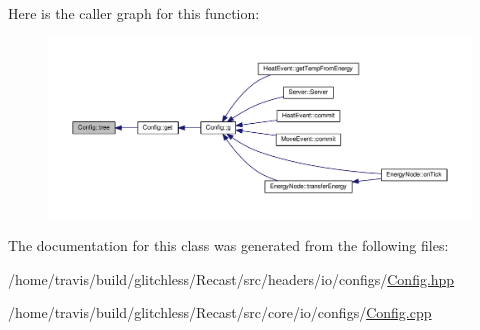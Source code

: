 Here is the caller graph for this function\-:
\nopagebreak
\begin{figure}[H]
\begin{center}
\leavevmode
\includegraphics[width=350pt]{class_config_a006701bd126aa5809b3a15e75c63bfb6_icgraph}
\end{center}
\end{figure}




The documentation for this class was generated from the following files\-:\begin{DoxyCompactItemize}
\item 
/home/travis/build/glitchless/\-Recast/src/headers/io/configs/\hyperlink{_config_8hpp}{Config.\-hpp}\item 
/home/travis/build/glitchless/\-Recast/src/core/io/configs/\hyperlink{_config_8cpp}{Config.\-cpp}\end{DoxyCompactItemize}
